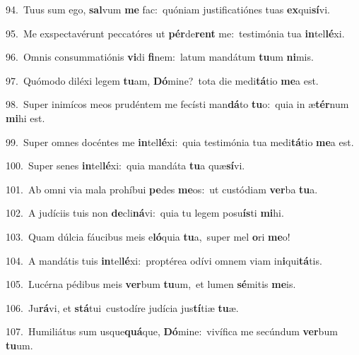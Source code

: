 {\numbfont\textcolor{\numbcolor}{94.}}~Tuus sum ego, \textbf{sal}\-vum \textbf{me} fac:~\star quóniam justificatiónes tuas \textbf{ex}\-qui\-\textbf{sí}\-vi.\par
{\numbfont\textcolor{\numbcolor}{95.}}~Me exspectavérunt peccatóres ut \textbf{pér}\-de\textbf{rent} me:~\star testimónia tua \textbf{in}\-tel\-\textbf{lé}\-xi.\par
{\numbfont\textcolor{\numbcolor}{96.}}~Omnis consummatiónis \textbf{vi}\-di \textbf{fi}\-nem:~\star latum mandátum \textbf{tu}\-um \textbf{ni}\-mis.\par
{\numbfont\textcolor{\numbcolor}{97.}}~Quómodo diléxi legem \textbf{tu}\-am, \textbf{Dó}\-mine?~\star tota die medi\-\textbf{tá}\-tio \textbf{me}\-a est.\par
{\numbfont\textcolor{\numbcolor}{98.}}~Super inimícos meos prudéntem me fecísti man\-\textbf{dá}\-to \textbf{tu}\-o:~\star quia in æ\-\textbf{tér}\-num \textbf{mi}\-hi est.\par
{\numbfont\textcolor{\numbcolor}{99.}}~Super omnes docéntes me \textbf{in}\-tel\-\textbf{lé}\-xi:~\star quia testimónia tua medi\-\textbf{tá}\-tio \textbf{me}\-a est.\par
{\numbfont\textcolor{\numbcolor}{100.}}~Super senes \textbf{in}\-tel\-\textbf{lé}\-xi:~\star quia mandáta \textbf{tu}\-a quæ\-\textbf{sí}\-vi.\par
{\numbfont\textcolor{\numbcolor}{101.}}~Ab omni via mala prohíbui \textbf{pe}\-des \textbf{me}\-os:~\star ut custódiam \textbf{ver}\-ba \textbf{tu}\-a.\par
{\numbfont\textcolor{\numbcolor}{102.}}~A judíciis tuis non \textbf{de}\-cli\-\textbf{ná}\-vi:~\star quia tu legem posu\-\textbf{ís}\-ti \textbf{mi}\-hi.\par
{\numbfont\textcolor{\numbcolor}{103.}}~Quam dúlcia fáucibus meis e\-\textbf{ló}\-quia \textbf{tu}\-a,~\star super mel \textbf{o}\-ri \textbf{me}\-o!\par
{\numbfont\textcolor{\numbcolor}{104.}}~A mandátis tuis \textbf{in}\-tel\-\textbf{lé}\-xi:~\star proptérea odívi omnem viam in\-\textbf{i}\-qui\-\textbf{tá}\-tis.\par
{\numbfont\textcolor{\numbcolor}{105.}}~Lucérna pédibus meis \textbf{ver}\-bum \textbf{tu}\-um,~\star et lumen \textbf{sé}\-mitis \textbf{me}\-is.\par
{\numbfont\textcolor{\numbcolor}{106.}}~Ju\-\textbf{rá}\-vi, et \textbf{stá}\-tui~\star custodíre judícia jus\-\textbf{tí}\-tiæ \textbf{tu}\-æ.\par
{\numbfont\textcolor{\numbcolor}{107.}}~Humiliátus sum usque\-\textbf{quá}\-que, \textbf{Dó}\-mine:~\star vivífica me secúndum \textbf{ver}\-bum \textbf{tu}\-um.\par
